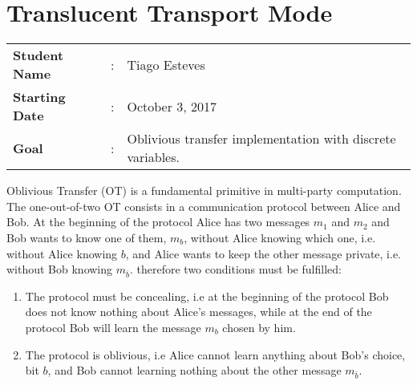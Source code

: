 \clearpage
\section{Translucent Transport Mode}

\begin{tcolorbox}	
\begin{tabular}{p{2.75cm} p{0.2cm} p{10.5cm}} 	
\textbf{Student Name}  &:& Tiago Esteves\\
\textbf{Starting Date} &:& October 3, 2017\\
\textbf{Goal}          &:& Oblivious transfer implementation with discrete variables.
\end{tabular}
\end{tcolorbox}

Oblivious Transfer (OT) is a fundamental primitive in multi-party computation. The one-out-of-two OT consists in a communication protocol between Alice and Bob. At the beginning of the protocol Alice has two messages $m_1$ and $m_2$ and Bob wants to know one of them, $m_b$, without Alice knowing which one, i.e. without Alice knowing $b$, and Alice wants to keep the other message private, i.e. without Bob knowing $m_{\bar{b}}$. therefore two conditions must be fulfilled:
\begin{enumerate}
	\item{The protocol must be concealing, i.e at the beginning of the protocol Bob does not know nothing about Alice's messages, while at the end of the protocol Bob will learn the message $m_{b}$ chosen by him.}
	\item{The protocol is oblivious, i.e Alice cannot learn anything about Bob's choice, bit $b$, and Bob cannot learning nothing about the other message $m_{\bar{b}}$.}
\end {enumerate}


